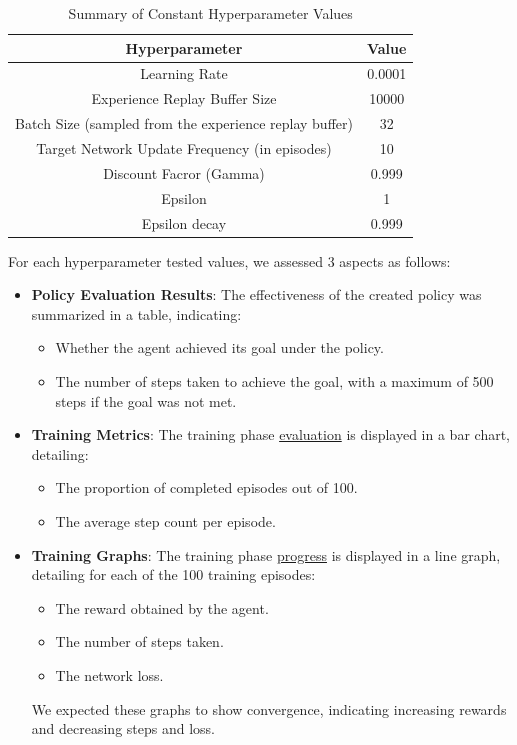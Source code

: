 \documentclass{article}
\begin{document}
\begin{table}[h]
\centering
\begin{tabular}{|c|c|}
\hline
\textbf{Hyperparameter} & \textbf{Value} \\ \hline
Learning Rate & 0.0001 \\ \hline
Experience Replay Buffer Size & 10000 \\ \hline
Batch Size (sampled from the experience replay buffer) & 32 \\ \hline
Target Network Update Frequency (in episodes) & 10 \\ \hline
Discount Facror (Gamma) & 0.999 \\ \hline
Epsilon & 1 \\ \hline
Epsilon decay & 0.999 \\ \hline

\end{tabular}
\caption{Summary of Constant Hyperparameter Values}
\label{table:constant_hyperparameters}
\end{table}

For each hyperparameter tested values, we assessed 3 aspects as follows:

\begin{itemize}
  \item \textbf{Policy Evaluation Results}: The effectiveness of the created policy was summarized in a table, indicating:
  \begin{itemize}
    \item Whether the agent achieved its goal under the policy.
    \item The number of steps taken to achieve the goal, with a maximum of 500 steps if the goal was not met.
  \end{itemize}

  \item \textbf{Training Metrics}: The training phase \underline{evaluation} is displayed in a bar chart, detailing:
  \begin{itemize}
    \item The proportion of completed episodes out of 100.
    \item The average step count per episode.
  \end{itemize}

  \item \textbf{Training Graphs}: The training phase \underline{progress} is displayed in a line graph, detailing for each of the 100 training episodes:
  \begin{itemize}
    \item The reward obtained by the agent.
    \item The number of steps taken.
    \item The network loss.
  \end{itemize}
  We expected these graphs to show convergence, indicating increasing rewards and decreasing steps and loss.
\end{itemize}
\end{document}
